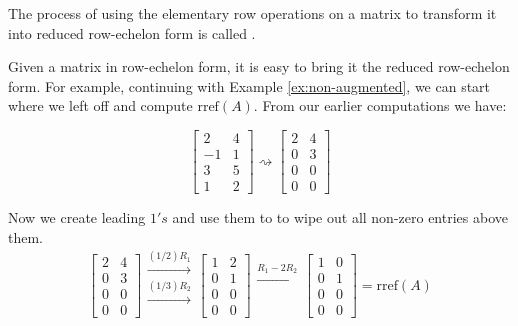 \documentclass{ximera}
\begin{document}
\begin{definition}\label{def:GaussJordanElimination}
The process of using the elementary row operations on a matrix to transform it into reduced row-echelon form is called .
\end{definition}
 
Given a matrix in row-echelon form, it is easy to bring it the reduced row-echelon form.  For example, continuing with Example \ref{ex:non-augmented}, we can start where we left off and compute $\mbox{rref}(A)$.  From our earlier computations we have:
 
$$\begin{bmatrix}2&4\\-1&1\\3&5\\1&2\end{bmatrix}\rightsquigarrow\begin{bmatrix}2&4\\0&3\\0&0\\0&0\end{bmatrix}$$
 
Now we create leading $1's$ and use them to to wipe out all non-zero entries above them.
$$\begin{bmatrix}2&4\\0&3\\0&0\\0&0\end{bmatrix}
  \begin{array}{c}
    \xrightarrow{(1/2)R_1}\\
  \xrightarrow{(1/3)R_2}\\
  \\
  \\
 \end{array}
\begin{bmatrix}1&2\\0&1\\0&0\\0&0\end{bmatrix}
  \begin{array}{c}
  \xrightarrow{R_1-2R_2}\\
\\
\\
 \\
 \end{array}
\begin{bmatrix}1&0\\0&1\\0&0\\0&0\end{bmatrix}=\mbox{rref}(A)$$
 
\end{document}
